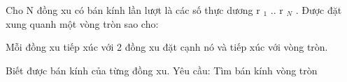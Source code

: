 Cho N đồng xu có bán kính lần lượt là các số thực dương r   $_    1   $   .. r   $_    N   $   . Được đặt xung quanh một vòng tròn sao cho:  

   Mỗi đồng xu tiếp xúc với 2 đồng xu đặt cạnh nó và tiếp xúc với vòng tròn.  

   Biết được bán kính của từng đồng xu. Yêu cầu: Tìm bán kính vòng tròn